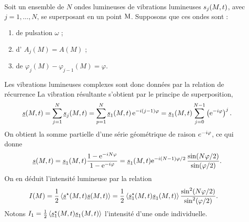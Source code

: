\documentclass[12pt,fancy]{cours}
\begin{document}
 Soit un ensemble de $N$ ondes lumineuses de vibrations lumineuses $s_j(M,t)$, avec $j=1,\ldots,N$, se superposant en un point $\rm M$. Supposons que ces ondes sont :
\begin{enumerate}
  \item {} de pulsation $\omega$ ;
  \item d' $A_j(M)=A(M)$ ;
  \item de  $\varphi_{j}(M)-\varphi_{j-1}(M)=\varphi$.
\end{enumerate} 
Les vibrations lumineuses complexes sont donc données par la relation de récurrence 
La vibration résultante s'obtient par le principe de superposition,
\begin{equation}
\underline{s}(M,t) =\sum_{j=1}^{N}  \underline{s}_{j}(M,t) =\sum_{p=1}^{N}\underline{s}_{1}(M,t)\,\mathrm{e}^{-i(j-1)\varphi} = \underline{s}_{1}(M,t) \sum_{j = 0}^{N - 1} \left( \mathrm{e}^{- i\varphi} \right)^j.
\end{equation}
On obtient la somme partielle d'une série géométrique de raison $e^{-i\varphi}$, ce qui donne 
\begin{equation}
  \underline{s}(M,t) = \underline{s}_{1}(M,t)\frac{1-\mathrm{e}^{-iN\varphi}}{1-\mathrm{e}^{-i\varphi}} = 
\underline{s}_{1}(M,t)\mathrm{e}^{-i(N-1)\varphi/2}\,\frac{\sin(N\varphi/2)}{\sin(\varphi/2)}.
 \end{equation}
 On en déduit l'intensité lumineuse par la relation
 \begin{equation}
 \label{eq:intensite_normalisee_N_ondes}
 \begin{split}
 I(M)&=\frac{1}{2}\left\langle {\underline{s}^{\star}(M,t)\underline{s}(M,t)} \right\rangle=\frac{1}{2}\left\langle {\underline{s}_{1}^{\star}(M,t)\underline{s}_{1}(M,t)} \right\rangle\frac{\sin^{2}(N\varphi/2)}{\sin^{2}(\varphi/2)}.
 \end{split}
 \end{equation}
 Notons $I_1 = \frac{1}{2}\left\langle {\underline{s}_{1}^{\star}(M,t)\underline{s}_{1}(M,t)} \right\rangle$ l'intensité d'une onde individuelle. 
\end{document}
